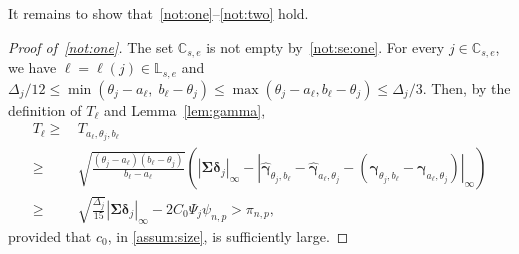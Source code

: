 \documentclass[11pt, a4paper]{article}
\renewcommand{\l}{\left}
\renewcommand{\r}{\right}
\def\wh{\widehat}
\newcommand{\cp}{\theta}
\theoremstyle{definition}
\theoremstyle{definition}
\theoremstyle{definition}
\theoremstyle{definition}
\theoremstyle{definition}
\theoremstyle{remark}
\theoremstyle{definition}
\theoremstyle{definition}
\theoremstyle{definition}
\begin{document}
It remains to show that~\ref{not:one}--\ref{not:two} hold.

\begin{proof}[Proof of~\ref{not:one}]
	The set $\mathbb{C}_{s, e}$ is not empty  by~\ref{not:se:one}.
	For every $j \in \mathbb{C}_{s, e}$, we have $\ell = \ell(j) \in \mathbb{L}_{s, e}$ and
	$\Delta_j/12 \le \min(\cp_j - a_{\ell},\; b_{\ell} - \cp_j) \le \max(\cp_j - a_{\ell}, b_{\ell} - \cp_j) \le \Delta_j/3$. Then, by the definition of $T_\ell$ and Lemma~\ref{lem:gamma},
	\begin{align*}
	T_{\ell} \ge & \, T_{a_{\ell}, \cp_j, b_{\ell}}
	\\
	\ge & \, 
	\sqrt{\frac{(\cp_j - a_{\ell})(b_{\ell} - \cp_j)}{b_{\ell} - a_{\ell}}} \l( \l\vert \bm\Sigma \bm\delta_j \r\vert_\infty - \l\vert \wh{\bm\gamma}_{\cp_j, b_{\ell}} - \wh{\bm\gamma}_{a_{\ell}, \cp_j} - \l( \bm\gamma_{\cp_j, b_{\ell}} - \bm\gamma_{a_{\ell}, \cp_j} \r) \r\vert_\infty \r)
	\\
	\ge & \, \sqrt{\frac{\Delta_j}{15}} \l\vert \bm\Sigma \bm\delta_j \r\vert_\infty  - 2 C_0 \Psi_j \psi_{n, p} > \pi_{n, p},
	\end{align*}
	provided that $c_0$, in \cref{assum:size}, is sufficiently large.
\end{proof}
\end{document}
